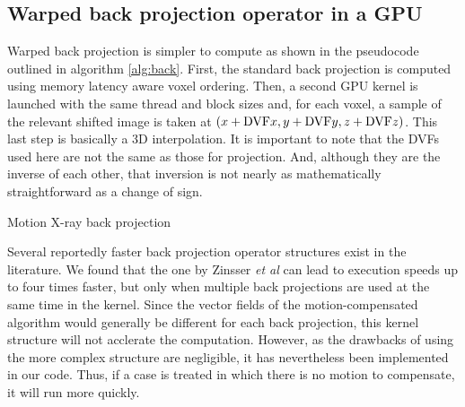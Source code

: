 \subsection{Warped back projection operator in a GPU}

Warped back projection is simpler to compute as shown in the pseudocode outlined in algorithm \ref{alg:back}.  First, the standard back projection is computed using memory latency aware voxel ordering.  Then, a second GPU kernel is launched with the same thread and block sizes and, for each voxel, a sample of the relevant shifted image is taken at $(x+\textup{DVF}x,y+\textup{DVF}y,z+\textup{DVF}z)$.  This last step is basically a 3D interpolation.  It is important to note that the DVFs used here are not the same as those for projection.  And, although they are the inverse of each other, that inversion is not nearly as mathematically straightforward as a change of sign.

\begin{algorithm}

\caption{Motion X-ray back projection
\label{alg:back}}
\begin{algorithmic}[1]
    
      \Ensure{} 
      
\Ensure{} 
\end{algorithmic}

\end{algorithm}

Several reportedly faster back projection operator structures exist in the literature.  We found that the one by Zinsser \textit{et al}\cite{zinsser2013systematic} can lead to execution speeds up to four times faster, but only when multiple back projections are used at the same time in the kernel.  Since the vector fields of the motion-compensated algorithm would generally be different for each back projection, this kernel structure will not acclerate the computation.  However, as the drawbacks of using the more complex structure are negligible, it has nevertheless been implemented in our code.  Thus, if a case is treated in which there is no motion to compensate, it will run more quickly.



